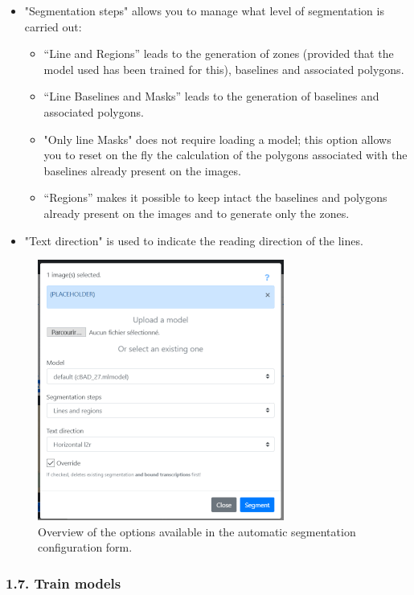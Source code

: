 \documentclass[
]{book}
\begin{document}
\begin{itemize}
\item
  "Segmentation steps" allows you to manage what level of
  segmentation is carried out:

  \begin{itemize}
  \item
    ``Line and Regions'' leads to the generation of zones (provided
    that the model used has been trained for this), baselines and
    associated polygons.
  \item
    ``Line Baselines and Masks'' leads to the generation of baselines
    and associated polygons.
  \item
    "Only line Masks" does not require loading a model; this
    option allows you to reset on the fly the calculation of the
    polygons associated with the baselines already present on the
    images.
  \item
    ``Regions'' makes it possible to keep intact the baselines and
    polygons already present on the images and to generate only the
    zones.
  \end{itemize}
\item
  "Text direction" is used to indicate the reading direction of the
  lines.
\end{itemize}

\begin{figure}
\centering
\includegraphics[width=3.19444in,height=3.375in]{img/eScrTut/image17.gif}
\caption{Overview of the options available in the automatic segmentation
configuration form.}
\end{figure}

\hypertarget{train-models}{%
\subsubsection{1.7. Train models}\label{train-models}}
\end{document}
